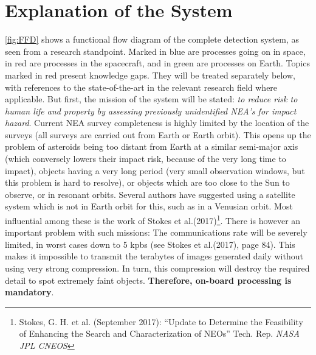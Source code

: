 \documentclass[a4paper,10pt]{article}
\begin{document}
\section{Explanation of the System}
\autoref{fig:FFD} shows a functional flow diagram of the complete detection system, as seen from a research standpoint. Marked in blue are processes going on in space, in red are processes in the spacecraft, and in green are processes on Earth. Topics marked in red present knowledge gaps. They will be treated separately below, with references to the state-of-the-art in the relevant research field where applicable. But first, the mission of the system will be stated: \textit{to reduce risk to human life and property by assessing previously unidentified NEA's for impact hazard}. Current NEA survey completeness is highly limited by the location of the surveys (all surveys are carried out from Earth or Earth orbit). This opens up the problem of asteroids being too distant from Earth at a similar semi-major axis (which conversely lowers their impact risk, because of the very long time to impact), objects having a very long period (very small observation windows, but this problem is hard to resolve), or objects which are too close to the Sun to observe, or in resonant orbits. Several authors have suggested using a satellite system which is not in Earth orbit for this, such as in a Venusian orbit. Most influential among these is the work of Stokes et al.(2017)\footnote{Stokes, G. H. et al. (September 2017): ``Update to Determine the Feasibility of Enhancing the Search and Characterization of NEOs'' Tech. Rep. \textit{NASA JPL CNEOS}}. There is however an important problem with such missions: The communications rate will be severely limited, in worst cases down to 5 kpbs (see Stokes et al.(2017), page 84). This makes it impossible to transmit the terabytes of images generated daily without using very strong compression. In turn, this compression will destroy the required detail to spot extremely faint objects. \textbf{Therefore, on-board processing is mandatory}.
\end{document}
